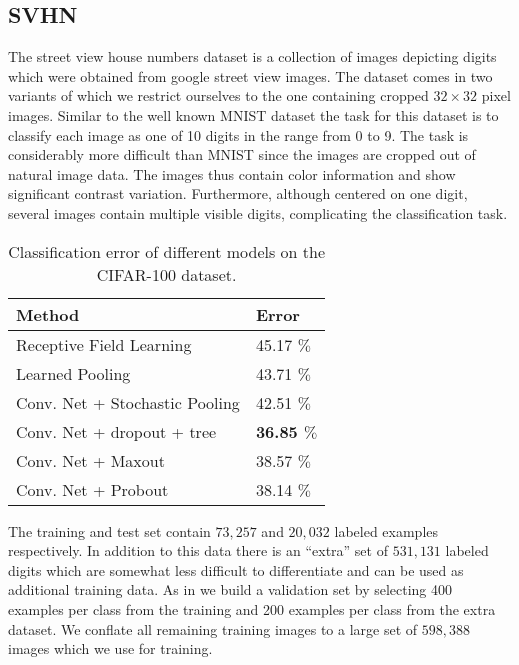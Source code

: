 \documentclass{article} \pdfoutput=1
\begin{document}
\subsection{SVHN}
The street view house numbers dataset \cite{Netzer2011} is a
collection of images depicting digits which were obtained from google
street view images. The dataset comes in two variants of which we
restrict ourselves to the one containing cropped $32 \times 32$ pixel
images. Similar to the well known MNIST dataset \cite{LeCun1998} the
task for this dataset is to classify each image as one of 10 digits in
the range from 0 to 9. The task is considerably more difficult than
MNIST since the images are cropped out of natural image data. The
images thus contain color information and show significant contrast
variation. Furthermore, although centered on one digit, several images
contain multiple visible digits, complicating the classification task.


\begin{table}[t]
\vskip 0.15in
\caption{Classification error of different models on the
  CIFAR-100 dataset.}
\begin{center}
\begin{small}
\begin{sc}
\begin{tabular}{l|l}
Method  & Error \\
\hline
Receptive Field Learning \cite{Jia2012} & 45.17 $\%$ \\
Learned Pooling \cite{Malinowski2013} & 43.71 $\%$ \\
Conv. Net + Stochastic Pooling \cite{ZeilerStochastic2013} & 42.51 $\%$ \\
Conv. Net + dropout + tree \cite{Nitish2013}  & \textbf{36.85 $\%$} \\
Conv. Net + Maxout  \cite{Goodfellow2013}  & 38.57 $\%$ \\
Conv. Net + Probout  & 38.14 $\%$ \\
\hline
\end{tabular}
\end{sc}
\end{small}
\end{center}
\vskip -0.1in
\label{cifar100_results}
\end{table}
The training and test set contain $73,257$ and $20,032$ labeled
examples respectively. In addition to this data there is an ``extra''
set of $531,131$ labeled digits which are somewhat less difficult to
differentiate and can be used as additional training data. As in
\cite{Goodfellow2013} we build a validation set by
selecting 400 examples per class from the training and 200 examples
per class from the extra dataset. We conflate all remaining training
images to a large set of $598,388$ images which we use for
training. 
\end{document}
